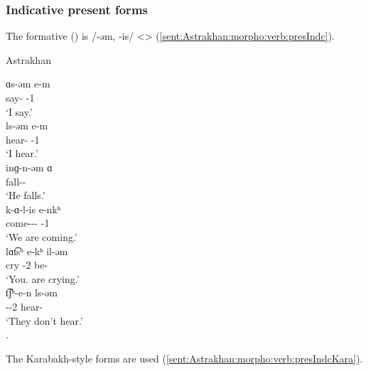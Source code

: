 \subsubsection{Indicative present forms}

The formative () is /-əm, -is/ <> (\ref{sent:Astrakhan:morpho:verb:presIndc}).

\begin{exe}
	\ex Astrakhan \label{sent:Astrakhan:morpho:verb:presIndc}
	\begin{xlist}
		\ex \gll ɑs-əm e-m \\
		say-{\impfcvb} {\aux}-1{\sg} \\
		\trans `I say.'\\
		\ex \gll ls-əm e-m \\
		hear-{\impfcvb} {\aux}-1{\sg} \\
		\trans `I hear.'\\
		\ex \gll inɡ-n-əm ɑ \\
		fall-{\vx}-{\impfcvb} {\aux} \\
		\trans `He falls.'\\
		\ex \gll k-ɑ-l-is e-nkʰ \\
		come-{\thgloss}-{\infgloss}-{\impfcvb} {\aux}-1{\pl} \\
		\trans `We are coming.'\\
		\ex \gll lɑt͡sʰ e-kʰ il-əm \\
		cry {\aux}-2{\pl} be-{\impfcvb} \\
		\trans `You.{\pl} are crying.'\\
		\ex \gll t͡ʃʰ-e-n ls-əm \\
		{\neggloss}-{\aux}-2{\pl} hear-{\impfcvb} \\
		\trans `They don't hear.'\\
		.
	\end{xlist}
\end{exe}

The Karabakh-style forms are used (\ref{sent:Astrakhan:morpho:verb:presIndcKara}).


